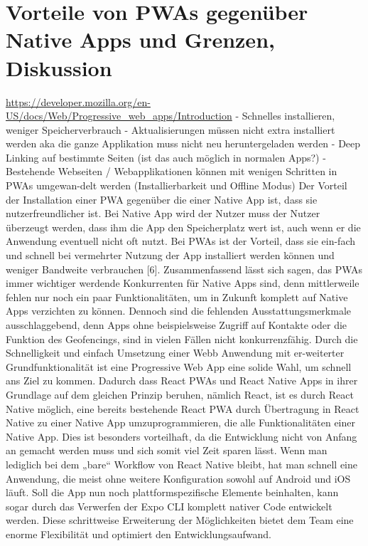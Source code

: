 \section{Vorteile von PWAs gegenüber Native Apps und Grenzen, Diskussion}
\url{https://developer.mozilla.org/en-US/docs/Web/Progressive_web_apps/Introduction}
-	Schnelles installieren, weniger Speicherverbrauch
-	Aktualisierungen müssen nicht extra installiert werden aka die ganze Applikation muss nicht neu heruntergeladen werden
-	Deep Linking auf bestimmte Seiten (ist das auch möglich in normalen Apps?)
-	Bestehende Webseiten / Webapplikationen können mit wenigen Schritten in PWAs umgewan-delt werden (Installierbarkeit und Offline Modus)
Der Vorteil der Installation einer PWA gegenüber die einer Native App ist, dass sie nutzerfreundlicher ist. Bei Native App wird der Nutzer muss der Nutzer überzeugt werden, dass ihm die App den Speicherplatz wert ist, auch wenn er die Anwendung eventuell nicht oft nutzt. Bei PWAs ist der Vorteil, dass sie ein-fach und schnell bei vermehrter Nutzung der App installiert werden können und weniger Bandweite verbrauchen [6].
Zusammenfassend lässt sich sagen, das PWAs immer wichtiger werdende Konkurrenten für Native Apps sind, denn mittlerweile fehlen nur noch ein paar Funktionalitäten, um in Zukunft komplett auf Native Apps verzichten zu können. Dennoch sind die fehlenden Ausstattungsmerkmale ausschlaggebend, denn Apps ohne beispielsweise Zugriff auf Kontakte oder die Funktion des Geofencings, sind in vielen Fällen nicht konkurrenzfähig. Durch die Schnelligkeit und einfach Umsetzung einer Webb Anwendung mit er-weiterter Grundfunktionalität ist eine Progressive Web App eine solide Wahl, um schnell ans Ziel zu kommen. Dadurch dass React PWAs und React Native Apps in ihrer Grundlage auf dem gleichen Prinzip beruhen, nämlich React, ist es durch React Native möglich, eine bereits bestehende React PWA durch Übertragung in React Native zu einer Native App umzuprogrammieren, die alle Funktionalitäten einer Native App. Dies ist besonders vorteilhaft, da die Entwicklung nicht von Anfang an gemacht werden muss und sich somit viel Zeit sparen lässt. Wenn man lediglich bei dem „bare“ Workflow von React Native bleibt, hat man schnell eine Anwendung, die meist ohne weitere Konfiguration sowohl auf Android und iOS läuft. Soll die App nun noch plattformspezifische Elemente beinhalten, kann sogar durch das Verwerfen der Expo CLI komplett nativer Code entwickelt werden. Diese schrittweise Erweiterung der Möglichkeiten bietet dem Team eine enorme Flexibilität und optimiert den Entwicklungsaufwand.

